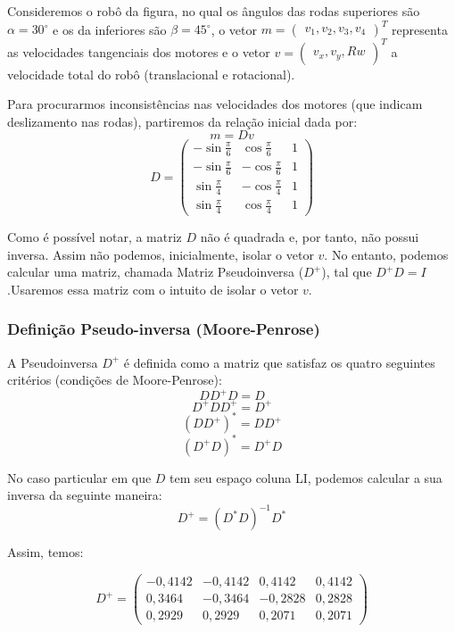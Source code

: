 \documentclass{article}
\begin{document}
\hspace{1cm}Consideremos o robô da figura, no qual os ângulos das rodas superiores são $\alpha=30^{\circ}$ e os da inferiores são $\beta=45^{\circ}$, o vetor $m = \begin{pmatrix} v_{1},v_{2},v_{3},v_{4} \end{pmatrix}^T$ representa as velocidades tangenciais dos motores e o vetor $v = \begin{pmatrix} v_{x},v_{y},Rw \end{pmatrix}^T$ a velocidade total do robô (translacional e rotacional).

Para procurarmos inconsistências nas velocidades dos motores (que indicam deslizamento nas rodas), partiremos da relação inicial dada por:
\[m = Dv\]
\[D
=
\begin{pmatrix}
  -\sin{\frac{\pi}{6}} &  \cos{\frac{\pi}{6}} & 1 \\
  -\sin{\frac{\pi}{6}} &  -\cos{\frac{\pi}{6}} &  1 \\
  \sin{\frac{\pi}{4}} & -\cos{\frac{\pi}{4}}   &  1  \\
  \sin{\frac{\pi}{4}} &  \cos{\frac{\pi}{4}} & 1
 \end{pmatrix}
\]

Como é possível notar, a matriz $D$ não é quadrada e, por tanto, não possui inversa. Assim não podemos, inicialmente, isolar o vetor $v$. No entanto, podemos calcular uma matriz, chamada Matriz Pseudoinversa ($D^+$), tal que $D^+D=I$ .Usaremos essa matriz com o intuito de isolar o vetor $v$.

\subsubsection{Definição Pseudo-inversa (Moore-Penrose)}

\hspace{1cm} A Pseudoinversa $D^+$ é definida como a matriz que satisfaz os quatro seguintes critérios (condições de Moore-Penrose):
\[DD^+D=D\]
\[D^+DD^+=D^+\]
\[(DD^+)^*=DD^+\]
\[(D^+D)^*=D^+D\]

No caso particular em que $D$ tem seu espaço coluna LI, podemos calcular a sua inversa da seguinte maneira:
\[ D^+ = (D^*D)^{-1} D^*\]

Assim, temos:

\[D^+
=
\begin{pmatrix}
  -0,4142    &-0,4142    & 0,4142    & 0,4142    \\
 0,3464 &  -0,3464 & -0,2828 & 0,2828 \\
 0,2929 & 0,2929 & 0,2071& 0,2071
 \end{pmatrix}
\]
\end{document}
